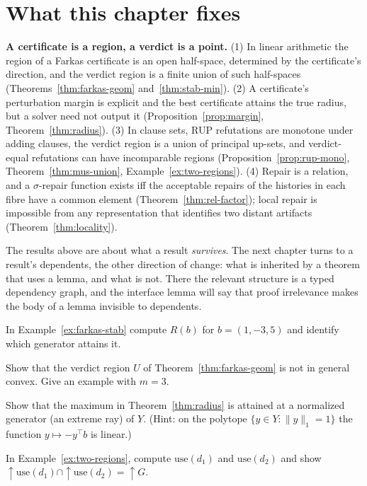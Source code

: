 \section{What this chapter fixes}

\begin{principal}
\textbf{A certificate is a region, a verdict is a point.} (1) In linear arithmetic the region of a Farkas certificate is an open half-space, determined by the certificate's direction, and the verdict region is a finite union of such half-spaces (Theorems~\ref{thm:farkas-geom} and~\ref{thm:stab-min}). (2) A certificate's perturbation margin is explicit and the best certificate attains the true radius, but a solver need not output it (Proposition~\ref{prop:margin}, Theorem~\ref{thm:radius}). (3) In clause sets, RUP refutations are monotone under adding clauses, the verdict region is a union of principal up-sets, and verdict-equal refutations can have incomparable regions (Proposition~\ref{prop:rup-mono}, Theorem~\ref{thm:mus-union}, Example~\ref{ex:two-regions}). (4) Repair is a relation, and a $\sigma$-repair function exists iff the acceptable repairs of the histories in each fibre have a common element (Theorem~\ref{thm:rel-factor}); local repair is impossible from any representation that identifies two distant artifacts (Theorem~\ref{thm:locality}).
\end{principal}

The results above are about what a result \emph{survives}. The next chapter turns to a result's dependents, the other direction of change: what is inherited by a theorem that uses a lemma, and what is not. There the relevant structure is a typed dependency graph, and the interface lemma will say that proof irrelevance makes the body of a lemma invisible to dependents.

\begin{exercise}
In Example~\ref{ex:farkas-stab} compute $R(b)$ for $b=(1,-3,5)$ and identify which generator attains it.
\end{exercise}

\begin{exercise}
Show that the verdict region $U$ of Theorem~\ref{thm:farkas-geom} is not in general convex. Give an example with $m=3$.
\end{exercise}

\begin{exercise}
Show that the maximum in Theorem~\ref{thm:radius} is attained at a normalized generator (an extreme ray) of $Y$. (Hint: on the polytope $\{y\in Y:\|y\|_1=1\}$ the function $y\mapsto-y^{\top}b$ is linear.)
\end{exercise}

\begin{exercise}
In Example~\ref{ex:two-regions}, compute $\mathrm{use}(d_1)$ and $\mathrm{use}(d_2)$ and show $\uparrow\mathrm{use}(d_1)\cap\uparrow\mathrm{use}(d_2)=\uparrow G$.
\end{exercise}
